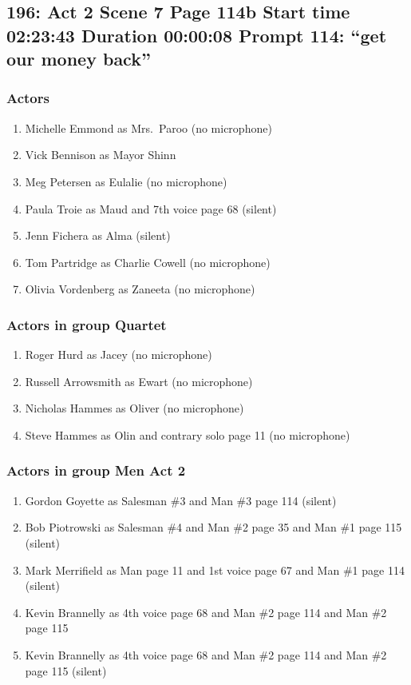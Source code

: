 \subsection{196: Act 2 Scene 7 Page 114b Start time 02:23:43 Duration 00:00:08 Prompt 114: ``get our money back''}

\subsubsection{Actors}
\begin{enumerate}
\item Michelle Emmond as Mrs.~Paroo (no microphone)
\item Vick Bennison as Mayor Shinn
\item Meg Petersen as Eulalie (no microphone)
\item Paula Troie as Maud and 7th voice page 68 (silent)
\item Jenn Fichera as Alma (silent)
\item Tom Partridge as Charlie Cowell (no microphone)
\item Olivia Vordenberg as Zaneeta (no microphone)
\end{enumerate}
\subsubsection{Actors in group Quartet}
\begin{enumerate}
\item Roger Hurd as Jacey (no microphone)
\item Russell Arrowsmith as Ewart (no microphone)
\item Nicholas Hammes as Oliver (no microphone)
\item Steve Hammes as Olin and contrary solo page 11 (no microphone)
\end{enumerate}
\subsubsection{Actors in group Men Act 2}
\begin{enumerate}
\item Gordon Goyette as Salesman \#3 and Man \#3 page 114 (silent)
\item Bob Piotrowski as Salesman \#4 and Man \#2 page 35 and Man \#1 page 115 (silent)
\item Mark Merrifield as Man page 11 and 1st voice page 67 and Man \#1 page 114 (silent)
\item Kevin Brannelly as 4th voice page 68 and Man \#2 page 114 and Man \#2 page 115
\item Kevin Brannelly as 4th voice page 68 and Man \#2 page 114 and Man \#2 page 115 (silent)
\end{enumerate}
